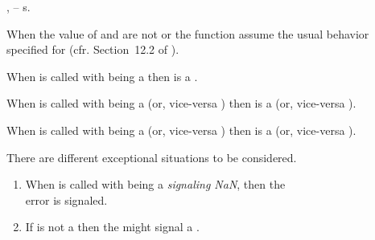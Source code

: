 \documentclass[../Arithmetic-Operations.tex]{subfiles}
\begin{document}

\DSyntax{}

  \RArrow{} 

\DArgsNValues{}

,  -- \CL{} s.

\DDescription{}

When the value of  \code{)} and
 \code{)} are not
 or  the function
 assume the usual behavior specified for \CL{} (cfr.
Section~12.2 of \cite{1996:ANSIHyperSpec}).

When  is called with  being a
 then  is a
.

When  is called with 
\code{)}  being a  (or,
vice-versa ) then 
 \code{)} is a
 (or, vice-versa ).

When  is called with 
\code{)}  being a  (or,
vice-versa ) then 
 \code{)} is a
 (or, vice-versa ).

\DExceptional{}

There are different exceptional situations to be considered.

\begin{enumerate}
\item When  is called with 
   being a \emph{signaling NaN}, then the\\
   error is signaled.

\item If  is not a \CL{} 
  then the 
  might signal a .
\end{enumerate}

\DSeeAlso{}

\code{-}
\end{document}
